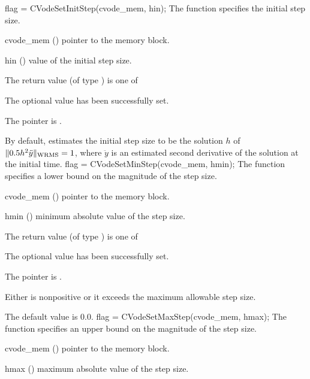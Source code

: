 {
flag = CVodeSetInitStep(cvode\_mem, hin);
}
{
  The function  specifies the initial step size.
}
{
  \begin{args}
  \item[cvode\_mem] ()
    pointer to the {\cvodes} memory block.
  \item[hin] ()
    value of the initial step size.
  \end{args}
}
{
  The return value  (of type ) is one of
  \begin{args}
  \item[\Id{CV\_SUCCESS}] 
    The optional value has been successfully set.
  \item[\Id{CV\_MEM\_NULL}]
    The  pointer is .
  \end{args}
}
{
  By default, {\cvodes} estimates the initial step size to be the solution $h$ 
  of $\| 0.5 h^2 {\ddot y} \|_{\mbox{\scriptsize WRMS}} = 1$,
  where ${\ddot y}$ is an estimated second derivative of the solution at the
  initial time.
}
{
flag = CVodeSetMinStep(cvode\_mem, hmin);
}
{
  The function  specifies a lower bound on the magnitude
  of the step size.
}
{
  \begin{args}
  \item[cvode\_mem] ()
    pointer to the {\cvodes} memory block.
  \item[hmin] ()
    minimum absolute value of the step size.
  \end{args}
}
{
  The return value  (of type ) is one of
  \begin{args}
  \item[\Id{CV\_SUCCESS}] 
    The optional value has been successfully set.
  \item[\Id{CV\_MEM\_NULL}]
    The  pointer is .
  \item[\Id{CV\_ILL\_INPUT}]
    Either  is nonpositive or it exceeds the maximum allowable step size.
  \end{args}
}
{
  The default value is $0.0$.
}
{
flag = CVodeSetMaxStep(cvode\_mem, hmax);
}
{
  The function  specifies an upper bound on the magnitude
  of the step size.
}
{
  \begin{args}
  \item[cvode\_mem] ()
    pointer to the {\cvodes} memory block.
  \item[hmax] ()
    maximum absolute value of the step size.
  \end{args}
}

